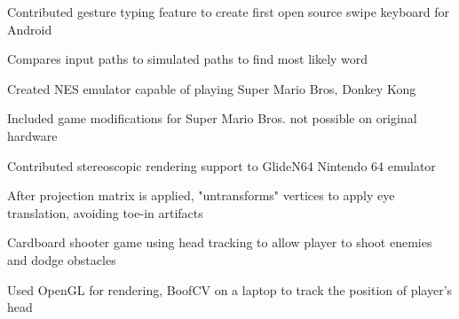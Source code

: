 \documentclass[12pt]{jmichaud-resume}
\begin{document}
 \hfill {}

\begin{minipage}[t]{0.495\textwidth} 

 \hfill
{}
\begin{tightemize}
	\item Contributed gesture typing feature to create first open source swipe keyboard for Android
	\item Compares input paths to simulated paths to find most likely word
\end{tightemize}

\sectionsep

\end{minipage} 
\hfill
\begin{minipage}[t]{0.49\textwidth}

 \hfill
{}
\begin{tightemize}
	\item Created NES emulator capable of playing Super Mario Bros, Donkey Kong
	\item Included game modifications for Super Mario Bros. not possible on original hardware
\end{tightemize}

\sectionsep

\end{minipage} 
\hfill
\begin{minipage}[t]{0.49\textwidth}

 \hfill
{}
\begin{tightemize}
	\item Contributed stereoscopic rendering support to GlideN64 Nintendo 64 emulator
	\item After projection matrix is applied, "untransforms" vertices to apply eye translation, avoiding toe-in artifacts 
\end{tightemize}
\sectionsep

\end{minipage} 
\hfill
\begin{minipage}[t]{0.49\textwidth}

 \hfill
{}
\begin{tightemize}
	\item Cardboard shooter game using head tracking to allow player to shoot enemies and dodge obstacles
	\item Used OpenGL for rendering, BoofCV on a laptop to track the position of player’s head
\end{tightemize}
\sectionsep
\end{minipage}
\end{document}
